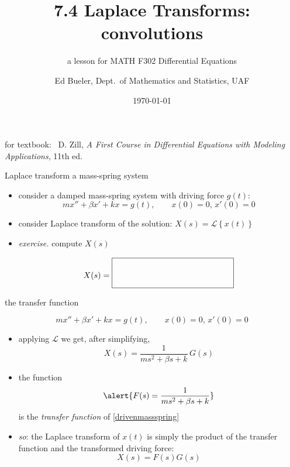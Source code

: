 \documentclass[urlcolor=blue,dvipsnames]{beamer}
\title{7.4 Laplace Transforms: \\ convolutions}
\subtitle{a lesson for MATH F302 Differential Equations}
\author{Ed Bueler, Dept.~of Mathematics and Statistics, UAF}
\date{\tiny \today}
\begin{document}
\renewcommand{\thefootnote}{{\color{green} \arabic{footnote}}}

\begin{frame}
\titlepage

\centerline{\tiny for textbook: \, D. Zill, \emph{A First Course in Differential Equations with Modeling Applications}, 11th ed.}
\end{frame}

\newcommand{\LL}[1]{\mathcal{L}\left\{#1\right\}}
\newcommand{\LLi}[1]{\mathcal{L}^{-1}\left\{#1\right\}}


\begin{frame}{Laplace transform a mass-spring system}

\begin{itemize}
\item consider a damped mass-spring system with driving force $g(t)$:
\begin{equation*}
m x'' + \beta x' + k x = g(t), \qquad x(0)=0, \, x'(0)=0
\end{equation*}
\item consider Laplace transform of the solution: $X(s)=\LL{x(t)}$
\item \emph{exercise.}  compute $X(s)$
\vspace{35mm}

    $$\hfill X(s) = \boxed{\Huge \strut \hspace{50mm}}$$
\end{itemize}

\end{frame}


\begin{frame}{the transfer function}

\begin{equation}
m x'' + \beta x' + k x = g(t), \qquad x(0)=0, \, x'(0)=0  \tag{$\ast$} \label{drivenmassspring}
\end{equation}

\begin{itemize}
\item applying $\mathcal{L}$ we get, after simplifying,
    $$X(s) = \frac{1}{ms^2+\beta s+k}\,G(s)$$
\item the function
    $$\alert{F(s) = \frac{1}{ms^2+\beta s+k}}$$
is the \alert{\emph{transfer function}} of \eqref{drivenmassspring}
\item \emph{so}: the Laplace transform of $x(t)$ is simply the product of the transfer function and the transformed driving force:
    $$X(s) = F(s) G(s)$$
\end{itemize}
\end{frame}
\end{document}
